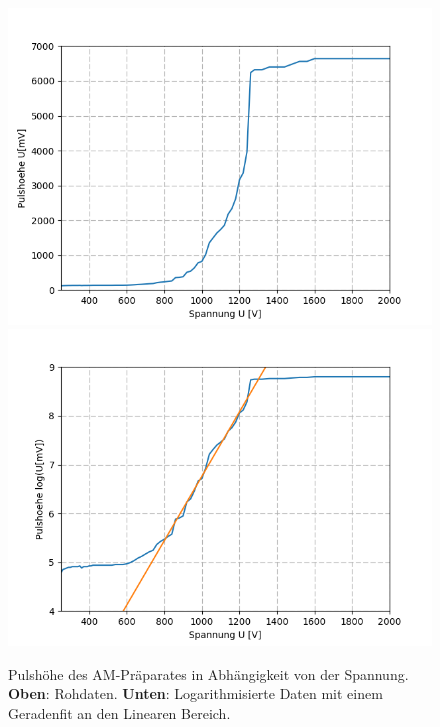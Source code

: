 \documentclass[12pt,a4paper]{article}
\begin{document}
\begin{figure}
\centering
\includegraphics[scale=0.8]{Bilder/Prop/Am_Puls_lin.PNG}
\includegraphics[scale=0.8]{Bilder/Prop/Am_Puls_exp.PNG}
\caption{Pulshöhe des AM-Präparates in Abhängigkeit von der Spannung. \textbf{Oben}: Rohdaten. \textbf{Unten}: Logarithmisierte Daten mit einem Geradenfit an den Linearen Bereich.}
\label{fig:AMPulse}
\end{figure}
\end{document}
